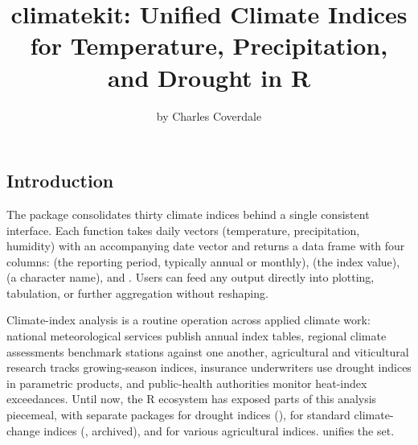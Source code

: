 \title{climatekit: Unified Climate Indices for Temperature,
Precipitation, and Drought in R}
\author{by Charles Coverdale}

\maketitle


\subsection{Introduction}\label{introduction}

The  package consolidates thirty climate indices
behind a single consistent interface. Each function takes daily vectors
(temperature, precipitation, humidity) with an accompanying date vector
and returns a data frame with four columns:  (the reporting
period, typically annual or monthly),  (the index value),
 (a character name), and . Users can feed any
output directly into plotting, tabulation, or further aggregation
without reshaping.

Climate-index analysis is a routine operation across applied climate
work: national meteorological services publish annual index tables,
regional climate assessments benchmark stations against one another,
agricultural and viticultural research tracks growing-season indices,
insurance underwriters use drought indices in parametric products, and
public-health authorities monitor heat-index exceedances. Until now, the
R ecosystem has exposed parts of this analysis piecemeal, with separate
packages for drought indices (), for standard
climate-change indices (, archived), and for various
agricultural indices.  unifies the set.

